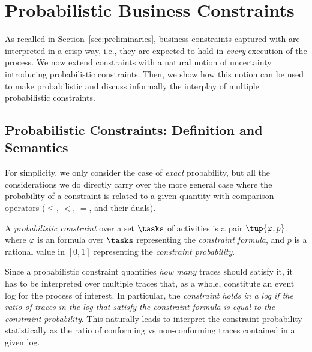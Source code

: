 
\newcommand{\stoclang}{\rho}
\newcommand{\evlog}{\mathcal{L}}
\newcommand{\nop}{\activity{nop}}
\newcommand{\cancel}{\activity{cancel}}
\newcommand{\pay}{\activity{pay}}
\newcommand{\ship}{\activity{ship}}

\newcommand{\model}{\mathcal{M}}
\newcommand{\cset}{\mathcal{C}}
\newcommand{\crispc}{\cset_{\mathit{crisp}}}
\newcommand{\probc}{\cset_{\mathit{prob}}}

\section{Probabilistic Business Constraints}
\label{sec:probdeclare}

As recalled in Section~\ref{sec:preliminaries}, business constraints captured with \LTLf are interpreted in a crisp way, i.e., they are expected to hold in \emph{every} execution of the process. We now extend constraints with a natural notion of uncertainty introducing probabilistic constraints. Then, we show how this notion can be used to make \declare probabilistic and discuss informally the interplay of multiple probabilistic constraints. %

\subsection{Probabilistic Constraints: Definition and Semantics}
For simplicity, we only consider the case of \emph{exact} probability, but all the considerations we do directly carry over the more general case where the probability of a constraint is related to a given quantity with comparison operators ($\leq$, $<$, $=$, and their duals).

\begin{definition}
  A \emph{probabilistic constraint} over a set $\tasks$ of activities is a pair $\tup{\varphi,p}$, where $\varphi$ is an \LTLf formula over $\tasks$ representing the \emph{constraint formula}, and  $p$ is a rational value in $[0,1]$ representing the \emph{constraint probability}.
\end{definition}

Since a probabilistic constraint quantifies \emph{how many} traces should satisfy it, it has to be interpreted over multiple traces that, as a whole, constitute an event log for the process of interest. In particular, the \emph{constraint holds in a log if the ratio of traces in the log that satisfy the constraint formula is equal to the constraint probability}. This naturally leads to interpret the constraint probability statistically as the ratio of conforming vs non-conforming traces contained in a given log.

